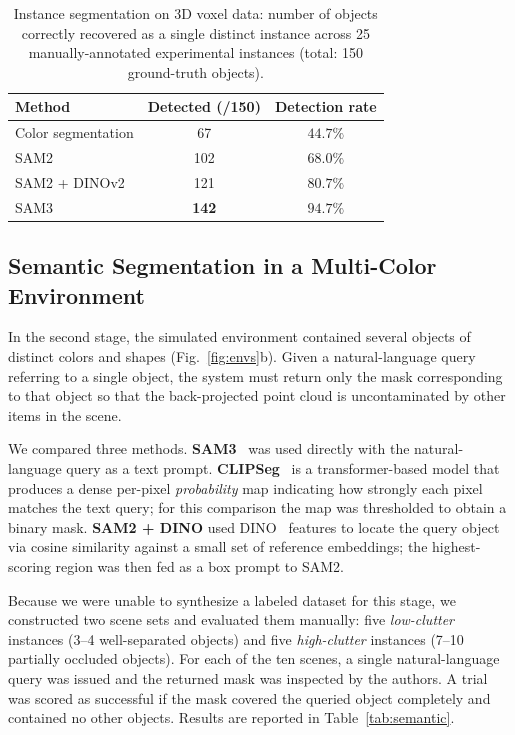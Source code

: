 \documentclass[conference,letterpaper,10pt]{IEEEtran}
\begin{document}
\begin{table}[!t]
\caption{Instance segmentation on 3D voxel data: number of objects
correctly recovered as a single distinct instance across 25
manually-annotated experimental instances (total: 150 ground-truth
objects).}
\label{tab:instance}
\centering
\renewcommand{\arraystretch}{1.15}
\begin{tabular}{lcc}
\toprule
Method                              & Detected (/150) & Detection rate \\
\midrule
Color segmentation                  & 67           & $44.7\%$          \\
SAM2~\cite{sam2}                    & 102          & $68.0\%$          \\
SAM2 + DINOv2~\cite{sam2,dinov2}    & 121          & $80.7\%$          \\
SAM3~\cite{sam3}                    & \textbf{142} & $\mathbf{94.7\%}$ \\
\bottomrule
\end{tabular}
\end{table}

\subsection{Semantic Segmentation in a Multi-Color Environment}
\label{subsec:semantic}

In the second stage, the simulated environment contained several
objects of distinct colors and shapes (Fig.~\ref{fig:envs}b). Given a
natural-language query referring to a single object, the system must
return only the mask corresponding to that object so that the
back-projected point cloud is uncontaminated by other items in the
scene.

We compared three methods. \textbf{SAM3}~\cite{sam3} was used directly
with the natural-language query as a text prompt. \textbf{CLIPSeg}~%
\cite{clipseg} is a transformer-based model that produces a dense
per-pixel \emph{probability} map indicating how strongly each pixel
matches the text query; for this comparison the map was thresholded
to obtain a binary mask. \textbf{SAM2 + DINO} used DINO~%
\cite{dinov2} features to locate the query object via cosine similarity
against a small set of reference embeddings; the highest-scoring region
was then fed as a box prompt to SAM2.

Because we were unable to synthesize a labeled dataset for this stage,
we constructed two scene sets and evaluated them manually: five
\emph{low-clutter} instances (3--4 well-separated objects) and five
\emph{high-clutter} instances (7--10 partially occluded objects). For
each of the ten scenes, a single natural-language query was issued and
the returned mask was inspected by the authors. A trial was scored as
successful if the mask covered the queried object completely and
contained no other objects. Results are reported in
Table~\ref{tab:semantic}.
\end{document}
